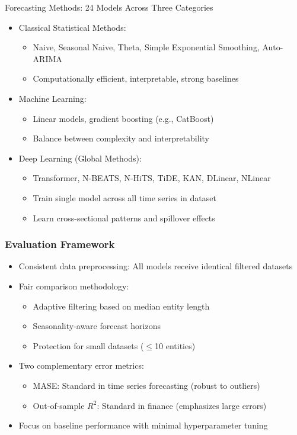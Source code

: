 \documentclass[ignorenonframetext, 9pt]{beamer}
\begin{document}
\begin{frame}{Forecasting Methods: 24 Models Across Three Categories}
\begin{itemize}
\item \alert{Classical Statistical Methods:}
\begin{itemize}
  \item Naive, Seasonal Naive, Theta, Simple Exponential Smoothing, Auto-ARIMA
  \item Computationally efficient, interpretable, strong baselines
\end{itemize}
\vspace{0.3cm}
\item \alert{Machine Learning:}
\begin{itemize}
  \item Linear models, gradient boosting (e.g., CatBoost)
  \item Balance between complexity and interpretability
\end{itemize}
\vspace{0.3cm}
\item \alert{Deep Learning (Global Methods):}
\begin{itemize}
  \item Transformer, N-BEATS, N-HiTS, TiDE, KAN, DLinear, NLinear
  \item Train single model across all time series in dataset
  \item Learn cross-sectional patterns and spillover effects
\end{itemize}
\end{itemize}
\end{frame}

\begin{frame}
  \frametitle{Evaluation Framework}
  \begin{itemize}
  \item \alert{Consistent data preprocessing:} All models receive identical filtered datasets
  \vspace{0.3cm}
  \item \alert{Fair comparison methodology:}
  \begin{itemize}
    \item Adaptive filtering based on median entity length
    \item Seasonality-aware forecast horizons
    \item Protection for small datasets ($\leq$10 entities)
  \end{itemize}
  \vspace{0.3cm}
  \item \alert{Two complementary error metrics:}
  \begin{itemize}
    \item MASE: Standard in time series forecasting (robust to outliers)
    \item Out-of-sample $R^2$: Standard in finance (emphasizes large errors)
  \end{itemize}
  \vspace{0.3cm}
  \item \alert{Focus on baseline performance} with minimal hyperparameter tuning
  \end{itemize}
\end{frame}
\end{document}
